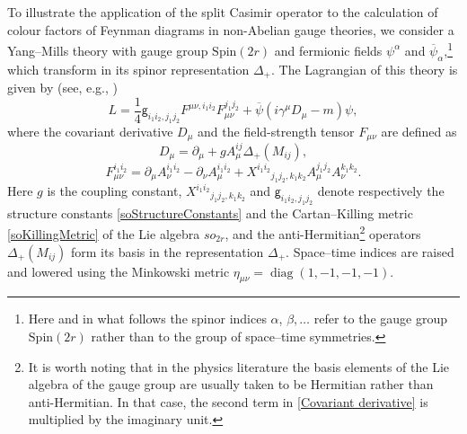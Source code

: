 \documentclass[a4paper]{article}
\newcommand{\kg}{\mathsf{g}}
\newcommand{\Spin}{\mathrm{Spin}}
\renewcommand{\=}{\ =\ }
\DeclareMathOperator{\diag}{diag}
\numberwithin{equation}{section}
\theoremstyle{remark}
\begin{document}
To illustrate the application of the split Casimir operator to the calculation of colour factors of Feynman diagrams in non-Abelian gauge theories, we consider a Yang–Mills theory with gauge group $\Spin(2r)$ and fermionic fields $\psi^\alpha$ and $\overline{\psi}_\alpha$,\footnote{Here and in what follows the spinor indices $\alpha$, $\beta,\dots$ refer to the gauge group $\Spin(2r)$ rather than to the group of space–time symmetries.} which transform in its spinor representation $\Delta_+$. The Lagrangian of this theory is given by (see, e.g., \cite{PesSchr})
\begin{equation}\label{Lagrangian}
L=\frac{1}{4}\kg_{i_1i_2,j_1j_2}F^{\mu\nu,i_1i_2}F_{\mu\nu}^{j_1j_2}+\overline{\psi}(i\gamma^\mu D_\mu-m)\psi,
\end{equation}
where the covariant derivative $D_\mu$ and the field-strength tensor $F_{\mu\nu}$ are defined as
\begin{equation}\label{Covariant derivative}
D_\mu=\partial_\mu+ g A_\mu^{ij}\Delta_+(M_{ij}),
\end{equation}
\begin{equation}\label{Field strength tensor}
F_{\mu\nu}^{i_1i_2}=\partial_\mu A_\nu^{i_1i_2}-\partial_\nu A_\mu^{i_1i_2}
+ X^{i_1i_2}{}_{j_1j_2,k_1k_2}A_\mu^{j_1j_2} A_\nu^{k_1k_2}.
\end{equation}
Here $g$ is the coupling constant, $X^{i_1i_2}{}_{j_1j_2,k_1k_2}$ and $\kg_{i_1i_2,j_1j_2}$ denote respectively the structure constants \eqref{soStructureConstants} and the Cartan–Killing metric \eqref{soKillingMetric} of the Lie algebra $so_{2r}$, and the anti-Hermitian\footnote{It is worth noting that in the physics literature the basis elements of the Lie algebra of the gauge group are usually taken to be Hermitian rather than anti-Hermitian. In that case, the second term in \eqref{Covariant derivative} is multiplied by the imaginary unit.} operators $\Delta_+(M_{ij})$ form its basis in the representation $\Delta_+$. Space–time indices are raised and lowered using the Minkowski metric $\eta_{\mu\nu}=\diag(1,-1,-1,-1)$.
\end{document}

